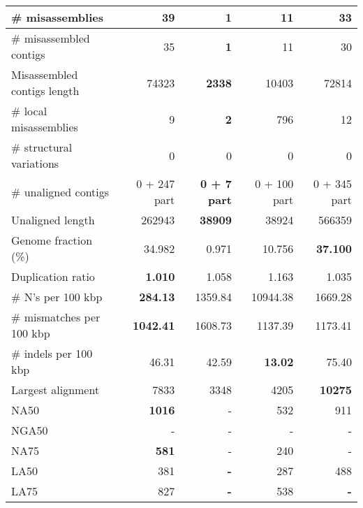\documentclass[12pt,a4paper]{article}
\begin{document}
\begin{table}[ht]
\begin{center}
\begin{tabular}{|l*{4}{|r}|}
\# misassemblies & 39 & {\bf 1} & 11 & 33 \\ \hline
\# misassembled contigs & 35 & {\bf 1} & 11 & 30 \\ \hline
Misassembled contigs length & 74323 & {\bf 2338} & 10403 & 72814 \\ \hline
\# local misassemblies & 9 & {\bf 2} & 796 & 12 \\ \hline
\# structural variations & 0 & 0 & 0 & 0 \\ \hline
\# unaligned contigs & 0 + 247 part & {\bf 0 + 7 part} & 0 + 100 part & 0 + 345 part \\ \hline
Unaligned length & 262943 & {\bf 38909} & 38924 & 566359 \\ \hline
Genome fraction (\%) & 34.982 & 0.971 & 10.756 & {\bf 37.100} \\ \hline
Duplication ratio & {\bf 1.010} & 1.058 & 1.163 & 1.035 \\ \hline
\# N's per 100 kbp & {\bf 284.13} & 1359.84 & 10944.38 & 1669.28 \\ \hline
\# mismatches per 100 kbp & {\bf 1042.41} & 1608.73 & 1137.39 & 1173.41 \\ \hline
\# indels per 100 kbp & 46.31 & 42.59 & {\bf 13.02} & 75.40 \\ \hline
Largest alignment & 7833 & 3348 & 4205 & {\bf 10275} \\ \hline
NA50 & {\bf 1016} & - & 532 & 911 \\ \hline
NGA50 & - & - & - & - \\ \hline
NA75 & {\bf 581} & - & 240 & - \\ \hline
LA50 & 381 & {\bf -} & 287 & 488 \\ \hline
LA75 & 827 & {\bf -} & 538 & {\bf -} \\ \hline
\end{tabular}
\end{center}
\end{table}
\end{document}
